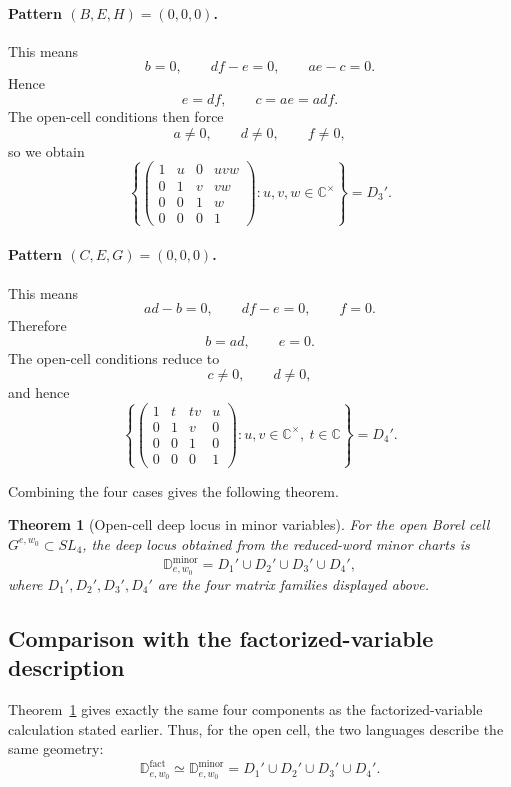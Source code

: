 \documentclass[12pt]{amsart}
\newcommand{\C}{\mathbb C}
\newcommand{\D}{\mathbb D}
\theoremstyle{plain}
\newtheorem{theorem}{Theorem}[section]
\theoremstyle{definition}
\theoremstyle{remark}
\begin{document}
\paragraph{\bf Pattern $(B,E,H)=(0,0,0)$.}
This means
\[
b=0,\qquad df-e=0,\qquad ae-c=0.
\]
Hence
\[
e=df,\qquad c=ae=adf.
\]
The open-cell conditions then force
\[
a\neq0,\qquad d\neq0,\qquad f\neq0,
\]
so we obtain
\[
\left\{
\begin{pmatrix}
1&u&0&uvw\\
0&1&v&vw\\
0&0&1&w\\
0&0&0&1
\end{pmatrix}
:u,v,w\in\C^{\times}
\right\}=D_3'.
\]

\paragraph{\bf Pattern $(C,E,G)=(0,0,0)$.}
This means
\[
ad-b=0,\qquad df-e=0,\qquad f=0.
\]
Therefore
\[
b=ad,\qquad e=0.
\]
The open-cell conditions reduce to
\[
c\neq0,\qquad d\neq0,
\]
and hence
\[
\left\{
\begin{pmatrix}
1&t&tv&u\\
0&1&v&0\\
0&0&1&0\\
0&0&0&1
\end{pmatrix}
:u,v\in\C^{\times},\ t\in\C
\right\}=D_4'.
\]

Combining the four cases gives the following theorem.

\begin{theorem}[Open-cell deep locus in minor variables]\label{thm:sl4_minor_deep}
For the open Borel cell $G^{e,w_0}\subset SL_4$, the deep locus obtained from the reduced-word minor charts is
\[
\D^{\mathrm{minor}}_{e,w_0}=D_1'\cup D_2'\cup D_3'\cup D_4',
\]
where $D_1',D_2',D_3',D_4'$ are the four matrix families displayed above.
\end{theorem}

\subsection{Comparison with the factorized-variable description}

Theorem~\ref{thm:sl4_minor_deep} gives exactly the same four components as the factorized-variable calculation stated earlier.  Thus, for the open cell, the two languages describe the same geometry:
\[
\D^{\mathrm{fact}}_{e,w_0}\simeq\D^{\mathrm{minor}}_{e,w_0}=D_1'\cup D_2'\cup D_3'\cup D_4'.
\]
\end{document}
